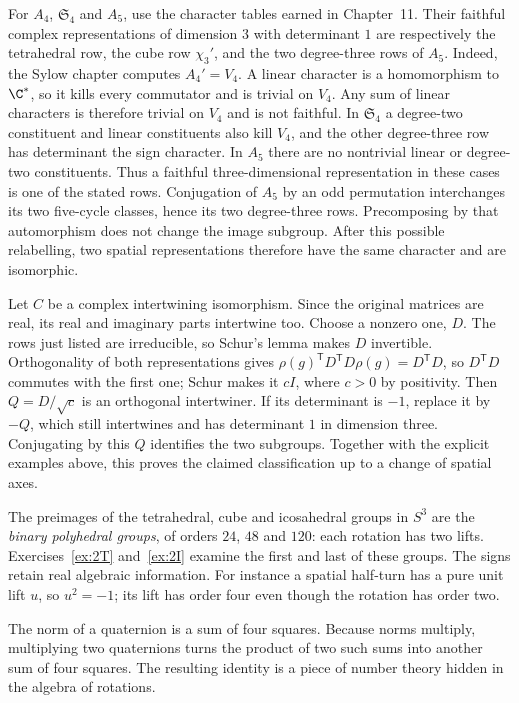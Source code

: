 For $A_4$, $\mathfrak S_4$ and $A_5$, use the character tables earned in
Chapter~11. Their faithful complex representations of dimension $3$ with
determinant $1$ are respectively the tetrahedral row, the cube row
$\chi_3'$, and the two degree-three rows of $A_5$.
Indeed, the Sylow chapter computes $A_4'=V_4$. A linear character is a homomorphism to $\C^*$, so it kills every commutator and is trivial on $V_4$. Any sum of linear characters is therefore trivial on $V_4$ and is not faithful. In $\mathfrak S_4$
a degree-two constituent and linear constituents also kill $V_4$, and the
other degree-three row has determinant the sign character. In $A_5$ there
are no nontrivial linear or degree-two constituents. Thus a faithful
three-dimensional representation in these cases is one of the stated rows.
Conjugation of $A_5$ by an odd permutation interchanges its two five-cycle
classes, hence its two degree-three rows. Precomposing by that automorphism
does not change the image subgroup. After this possible relabelling, two
spatial representations therefore have the same character and are isomorphic.

Let $C$ be a complex intertwining isomorphism. Since the original matrices
are real, its real and imaginary parts intertwine too. Choose a nonzero one,
$D$. The rows just listed are irreducible, so Schur's lemma makes $D$
invertible. Orthogonality of both representations gives
$\rho(g)^{\mathsf T}D^{\mathsf T}D\rho(g)=D^{\mathsf T}D$,
so $D^{\mathsf T}D$ commutes with the first one; Schur makes it $cI$, where $c>0$ by positivity.
Then $Q=D/\sqrt c$ is an orthogonal intertwiner. If its determinant is $-1$,
replace it by $-Q$, which still intertwines and has determinant $1$ in
dimension three. Conjugating by this $Q$ identifies the two subgroups.
Together with the explicit examples above, this proves the claimed
classification up to a change of spatial axes.

The preimages of the tetrahedral, cube and icosahedral groups in $S^3$
are the \emph{binary polyhedral groups}, of orders $24$, $48$ and $120$:
each rotation has two lifts. Exercises~\ref{ex:2T} and~\ref{ex:2I} examine
the first and last of these groups. The signs retain real algebraic information.
For instance a spatial half-turn has a pure unit lift $u$, so $u^2=-1$;
its lift has order four even though the rotation has order two.

The norm of a quaternion is a sum of four squares. Because norms multiply, multiplying two quaternions turns the product of two such sums into another sum of four squares. The resulting identity is a piece of number theory hidden in the algebra of rotations.

